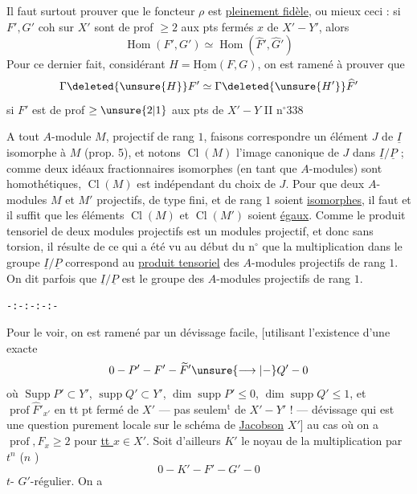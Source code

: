 
Il faut surtout prouver que le foncteur $\rho$ est \uline{pleinement fidèle}, ou mieux ceci : si $F',G'$  coh sur $X'$ sont de prof $\geq2$ aux pts  fermés $x$ de $X'-Y'$,  alors
\[
 \operatorname{Hom}(F',G')\simeq\operatorname{Hom}(\widehat F',\widehat G')
\]
Pour ce dernier fait, considérant $H=\operatorname{\underline{Hom}}(F,G)$, on est ramené à prouver que
\[
 \Gamma\deleted{\unsure{H}}F'\simeq\Gamma\deleted{\unsure{H'}}\widehat F'
\]
si $F'$ est de prof $\geq\unsure{2|1}$ aux pts  de $X'-Y$
II  \hfill n$^\circ$338

A tout $A$-module $M$, projectif de rang $1$, faisons correspondre un élément $J$ de $\underline{I}$ isomorphe à $M$ (prop. 5), et notons $\operatorname{Cl}(M)$ l'image canonique de $J$ dans $\underline{I}/\underline{P}$ ; comme deux idéaux fractionnaires isomorphes (en tant que $A$-modules) sont homothétiques, $\operatorname{Cl}(M)$ est indépendant du choix de $J$. Pour que deux $A$-modules $M$ et $M'$ projectifs, de type fini, et de rang $1$ soient \uline{isomorphes}, il faut et il suffit que les éléments $\operatorname{Cl}(M)$ et $\operatorname{Cl}(M')$ soient \uline{égaux}. Comme le produit tensoriel de deux modules projectifs est un modules projectif, et donc sans torsion, il résulte de ce qui a été vu au début du n$^\circ$ que la multiplication dans le groupe $\underline{I}/\underline{P}$ correspond au \uline{produit tensoriel} des $A$-modules projectifs de rang $1$. On dit parfois que $\underline{I}/\underline{P}$ est le groupe des $A$-modules projectifs de rang $1$.

\begin{center}\texttt{-:-:-:-:-}\end{center}
Pour le voir, on est ramené par un dévissage facile, [utilisant l'existence d'une  exacte
\[
 0-P'-F'-\widetilde F'\unsure{\longrightarrow|-}Q'-0
\]
où $\operatorname{Supp}P'\subset Y'$, $\operatorname{supp} Q'\subset Y'$, $\dim\operatorname{supp}P'\leq0$, $\dim\operatorname{supp}Q'\leq1$, et $\operatorname{prof}\widehat F'_{x'}$ en tt pt fermé de $X'$ --- pas seulem$^{\mathrm{t}}$ de $X'-Y'$ ! --- dévissage qui est une question purement locale sur le schéma de \uline{Jacobson} $X'$] au cas où on a $\operatorname{prof},F_x\geq2$  pour \uline{tt $x\in X'$}. Soit d'ailleurs $K'$ le noyau de la multiplication par $t^n$  ($n$ ) 
\[
 0-K'-F'-G'-0
\]
 $t$-  $G'$-régulier. On a

